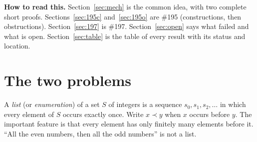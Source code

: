 \documentclass[11pt,letterpaper]{article}
\newcommand{\bef}{\prec}
\newcommand{\st}[1]{\textnormal{\textsf{\small[#1]}}}
\begin{document}
\begin{abstract}
\smallskip
\textbf{On \#197 we rule out the natural candidate splittings, one family at a time:} splittings whose lists
stay close to increasing order; splittings into long alternating runs (this includes the classical
``dyadic'' one); splittings with an odd number of equal runs per octave; splittings defined by an irrational
rotation; and, with a hand proof, random splittings.

\smallskip
\textbf{One idea runs through all of it.} Inside a finite block of integers there is a perfect way to avoid
progressions: sort by binary digits read from the right (the \emph{2-adic order}). It is essentially the
only way, because orders without monotone 3-term progressions are rigid. But a list must reach every integer
after finitely many steps, so blocks have to be cut by size, and the progressions that straddle a cut are
where every construction leaks and where every impossibility proof gets its grip.

\smallskip
\textbf{How much to trust it.} Statements marked \st{Lean} are checked by the Lean kernel. \st{Certified}
means a finite search problem was refuted by a SAT solver and the proof certificate was checked by a separate
program. \st{Hand} means a written proof, with the number of adversarial AI referees it survived.
\st{Evidence} means one program said so. Nothing here bears on whether the answer to \#195 is 3 or 4, and we
do not know whether the answer to \#197 is yes or no.
\end{abstract}

\noindent\textbf{How to read this.} Section~\ref{sec:mech} is the common idea, with two complete short
proofs. Sections~\ref{sec:195c} and~\ref{sec:195o} are \#195 (constructions, then obstructions).
Section~\ref{sec:197} is \#197. Section~\ref{sec:open} says what failed and what is open.
Section~\ref{sec:table} is the table of every result with its status and location.

\section{The two problems}

A \emph{list} (or \emph{enumeration}) of a set $S$ of integers is a sequence $s_0, s_1, s_2, \dots$ in which
every element of $S$ occurs exactly once. Write $x \bef y$ when $x$ occurs before $y$. The important feature
is that every element has only finitely many elements before it. ``All the even numbers, then all the odd
numbers'' is not a list.
\end{document}

